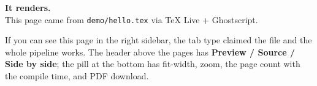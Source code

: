 \documentclass[11pt]{article}
\begin{document}
\begin{center}
  {\Huge\bfseries It renders.}\\[6pt]
  {\large This page came from \texttt{demo/hello.tex} via TeX Live + Ghostscript.}
\end{center}

\vspace{1em}
\noindent If you can see this page in the right sidebar, the tab type claimed the file and
the whole pipeline works. The header above the pages has \textbf{Preview / Source /
Side by side}; the pill at the bottom has fit-width, zoom, the page count with the compile
time, and PDF download.
\end{document}
